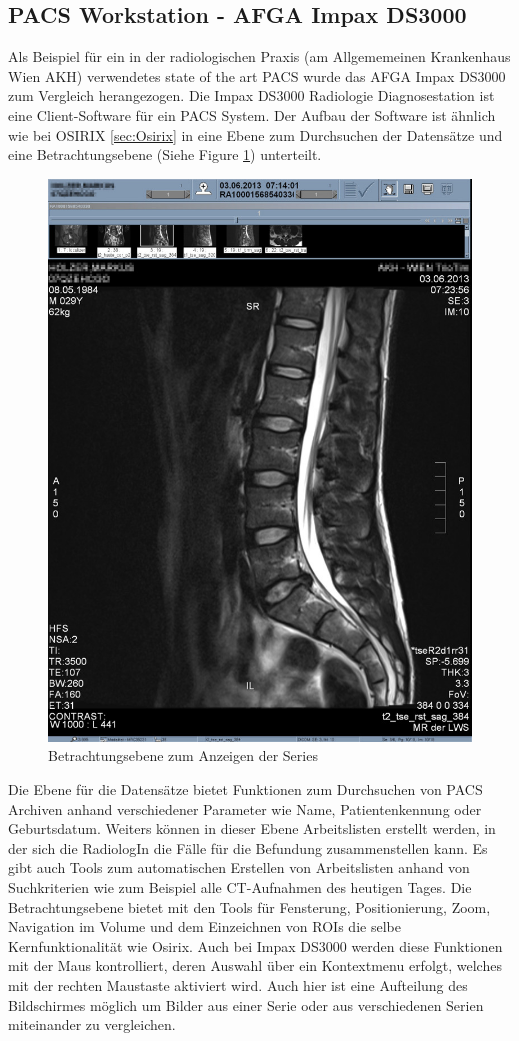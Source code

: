 \subsection{PACS Workstation - AFGA Impax DS3000}
\label{sec:PACS_Workstation}
Als Beispiel für ein in der radiologischen Praxis (am Allgememeinen Krankenhaus Wien AKH) verwendetes state of the art PACS wurde das AFGA Impax DS3000 zum Vergleich herangezogen. 
Die Impax DS3000 Radiologie Diagnosestation ist eine Client-Software für ein PACS System.
Der Aufbau der Software ist ähnlich wie bei OSIRIX \ref{sec:Osirix} in eine Ebene zum Durchsuchen der Datensätze und eine Betrachtungsebene (Siehe Figure \ref{fig:impacs_2d_view}) unterteilt.
%
\begin{figure}[t]
	\centering
	\includegraphics[width=0.48\linewidth]{img/c2_impacs_2d_view.jpg}
	\caption{Betrachtungsebene zum Anzeigen der Series}
	\label{fig:impacs_2d_view}
\end{figure}
%
Die Ebene für die Datensätze bietet Funktionen zum Durchsuchen von PACS Archiven anhand verschiedener Parameter wie Name, Patientenkennung oder Geburtsdatum.
Weiters können in dieser Ebene Arbeitslisten erstellt werden, in der sich die RadiologIn die Fälle für die Befundung zusammenstellen kann.
Es gibt auch Tools zum automatischen Erstellen von Arbeitslisten anhand von Suchkriterien wie zum Beispiel alle CT-Aufnahmen des heutigen Tages.
%
Die Betrachtungsebene bietet mit den Tools für Fensterung, Positionierung, Zoom, Navigation im Volume und dem Einzeichnen von ROIs die selbe Kernfunktionalität wie Osirix.
Auch bei Impax DS3000 werden diese Funktionen mit der Maus kontrolliert, deren Auswahl über ein Kontextmenu erfolgt, welches mit der rechten Maustaste aktiviert wird.
Auch hier ist eine Aufteilung des Bildschirmes möglich um Bilder aus einer Serie oder aus verschiedenen Serien miteinander zu vergleichen.


